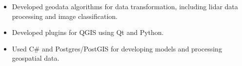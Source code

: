 \divider

\begin{itemize}
\item Developed geodata algorithms for data transformation, including lidar data processing and image classification.
\item Developed plugins for QGIS using Qt and Python.
\item Used C\# and Postgres/PostGIS for developing models and processing geospatial data.
\end{itemize}






